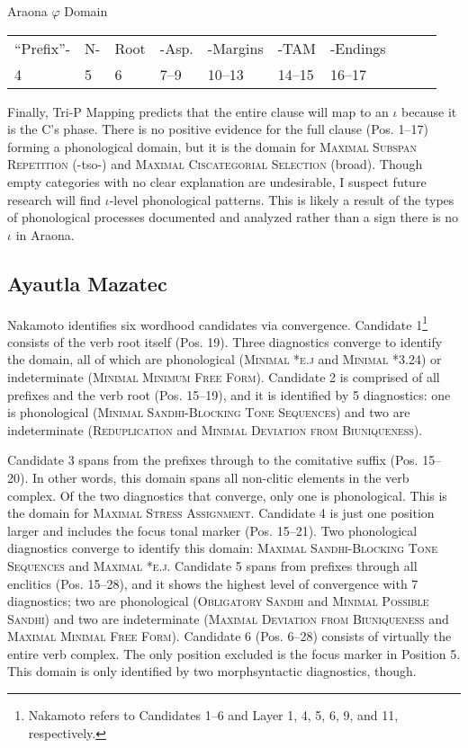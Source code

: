 \documentclass[output=paper]{langscibook}
\begin{document}
\ea
    Araona $\varphi$ Domain \\
    \begin{tabular}{llllllllll}
       ``Prefix''- & N- & Root & -Asp. & -Margins & -TAM & -Endings \\
       4 & 5 & 6 & 7--9 & 10--13 & 14--15 & 16--17
    \end{tabular}
\z

Finally, Tri-P Mapping predicts that the entire clause will map to an $\iota$ because it is the C's phase. There is no positive evidence for the full clause (Pos. 1--17) forming a phonological domain, but it is the domain for {\textsc{Maximal Subspan Repetition}} (-tso-) and {\textsc{Maximal Ciscategorial Selection}} (broad). Though empty categories with no clear explanation are undesirable, I suspect future research will find $\iota$-level phonological patterns. This is likely a result of the types of phonological processes documented and analyzed rather than a sign there is no $\iota$ in Araona.  

\subsection{Ayautla Mazatec}

Nakamoto identifies six wordhood candidates via convergence. Candidate 1\footnote{Nakamoto refers to Candidates 1--6 and Layer 1, 4, 5, 6, 9, and 11, respectively.} consists of the verb root itself (Pos. 19). Three diagnostics converge to identify the domain, all of which are phonological ({\textsc{Minimal *ε.j}} and {\textsc{Minimal *3.24}}) or indeterminate ({\textsc{Minimal Minimum Free Form}}). Candidate 2 is comprised of all prefixes and the verb root (Pos. 15--19), and it is identified by 5 diagnostics: one is phonological ({\textsc{Minimal Sandhi-Blocking Tone Sequences}}) and two are indeterminate ({\textsc{Reduplication}} and {\textsc{Minimal Deviation from Biuniqueness}}).

Candidate 3 spans from the prefixes through to the comitative suffix (Pos. 15--20). In other words, this domain spans all non-clitic elements in the verb complex. Of the two diagnostics that converge, only one is phonological. This is the domain for {\textsc{Maximal Stress Assignment}}. Candidate 4 is just one position larger and includes the focus tonal marker (Pos. 15--21). Two phonological diagnostics converge to identify this domain: {\textsc{Maximal Sandhi-Blocking Tone Sequences}} and {\textsc{Maximal *ε.j}}. Candidate 5 spans from prefixes through all enclitics (Pos. 15--28), and it shows the highest level of convergence with 7 diagnostics; two are phonological ({\textsc{Obligatory Sandhi}} and {\textsc{Minimal Possible Sandhi}}) and two are indeterminate ({\textsc{Maximal Deviation from Biuniqueness}} and {\textsc{Maximal Minimal Free Form}}). Candidate 6 (Pos. 6--28) consists of virtually the entire verb complex. The only position excluded is the focus marker in Position 5. This domain is only identified by two morphsyntactic diagnostics, though.
\end{document}
